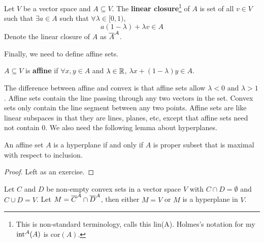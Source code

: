 \begin{definition}
  Let $V$ be a vector space and $A \subseteq V$. The \textbf{linear
    closure}\footnote{This is non-standard terminology,
    \cite{holmes1975} calls this lin(A). Holmes's notation for my
    ${\mathrm{int}}^{\mathcal{A}}({A})$ is $\mathrm{cor}(A)$.} of $A$ is set
  of all $v \in V$ such that $\exists a \in A$ such that
  $\forall \lambda \in [0,1)$,
  \[ a(1-\lambda) + \lambda v \in A \]
  Denote the linear closure of $A$ as ${\overline{{A}}}^\mathcal{A}$.
\end{definition}
Finally, we need to define affine sets.
\begin{definition}
  $A \subseteq V$ is \textbf{affine} if $\forall x, y \in A$ and $\lambda \in
  \mathbb{R}$, $\lambda x + (1-\lambda)y \in A$.
\end{definition}
The difference between affine and convex is that affine sets allow
$\lambda <0$ and $\lambda >1$. Affine sets contain the line passing
through any two vectors in the set. Convex sets only contain the line
segment between any two points. Affine sets are like linear subspaces
in that they are lines, planes, etc, except that affine sets need not
contain $0$.  We also need the following lemma about hyperplanes.
\begin{lemma}
  An affine set $A$ is a hyperplane if and only if $A$ is proper
  subset that is maximal with respect to inclusion.
\end{lemma}
\begin{proof}
  Left as an exercise.
\end{proof}
\begin{lemma}\label{lem:compconvex}
  Let $C$ and $D$ be non-empty convex sets in a vector space
  $V$ with $C \cap D = \emptyset$ and $C \cup D = V$. Let
  $M = {\overline{{C}}}^\mathcal{A} \cap {\overline{{D}}}^\mathcal{A}$, then either $M = V$ or $M$ is
  a hyperplane in $V$.
\end{lemma}
